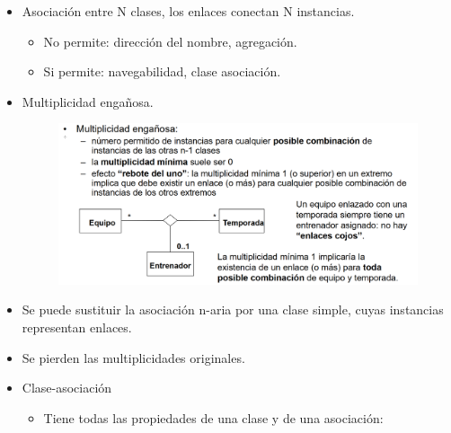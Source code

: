 \documentclass[12pt, twoside, openright]{report} %
\begin{document}
    \begin{itemize}
    \item
      Asociación entre N clases, los enlaces conectan N instancias.

      \begin{itemize}
      
      \item
        No permite: dirección del nombre, agregación.
      \item
        Si permite: navegabilidad, clase asociación.
      \end{itemize}
    \item
      Multiplicidad engañosa.
	  \begin{figure}[H]
		{\includegraphics[scale=.2]{Untitled 22.png}}
	\end{figure}
    \item
      Se puede sustituir la asociación n-aria por una clase simple,
      cuyas instancias representan enlaces.
    \item
      Se pierden las multiplicidades originales.
    \item
      Clase-asociación

      \begin{itemize}
      \item
        Tiene todas las propiedades de una clase y de una asociación:

        \begin{itemize}
        

\end{itemize}
\end{itemize}
\end{itemize}
\end{document}
